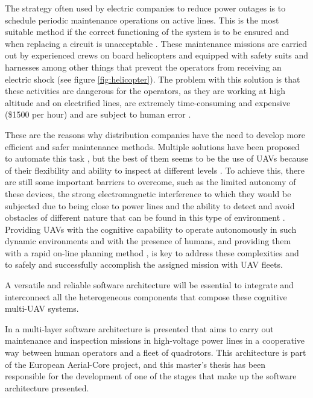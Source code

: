 The strategy often used by electric companies to reduce power outages is to schedule periodic maintenance operations on active lines. This is the most suitable method if the correct functioning of the system is to be ensured and when replacing a circuit is unacceptable \cite{PowerOutagesCauses}. These maintenance missions are carried out by experienced crews on board helicopters and equipped with safety suits and harnesses among other things that prevent the operators from receiving an electric shock (see figure \ref{fig:helicopter}). The problem with this solution is that these activities are dangerous for the operators, as they are working at high altitude and on electrified lines, are extremely time-consuming and expensive (\$1500 per hour) and are subject to human error \cite{MaintenanceCost}.

These are the reasons why distribution companies have the need to develop more efficient and safer maintenance methods. Multiple solutions have been proposed to automate this task \cite{MaintenanceSolutions}, but the best of them seems to be the use of \glspl{UAV} because of their flexibility and ability to inspect at different levels \cite{PowerOutagesCauses}. To achieve this, there are still some important barriers to overcome, such as the limited autonomy of these devices, the strong electromagnetic interference to which they would be subjected due to being close to power lines and the ability to detect and avoid obstacles of different nature that can be found in this type of environment \cite{MaintenanceCost}. Providing \glspl{UAV} with the cognitive capability to operate autonomously in such dynamic environments and with the presence of humans, and providing them with a rapid on-line planning method \cite{FastOnlinePlanning}, is key to address these complexities and to safely and successfully accomplish the assigned mission with \gls{UAV} fleets.

A versatile and reliable software architecture will be essential to integrate and interconnect all the heterogeneous components that compose these cognitive multi-\gls{UAV} systems. 


In \cite{AerialCoreMulti-Layer} a multi-layer software architecture is presented that aims to carry out maintenance and inspection missions in high-voltage power lines in a cooperative way between human operators and a fleet of quadrotors. This architecture is part of the European Aerial-Core project, and this master's thesis has been responsible for the development of one of the stages that make up the software architecture presented.

